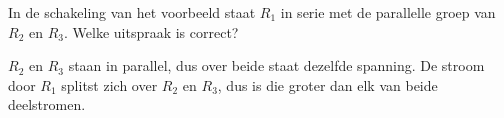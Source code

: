 \documentclass{ximera}
\begin{document}
\begin{question}
    In de schakeling van het voorbeeld staat $R_1$ in serie met de parallelle groep van $R_2$ en $R_3$. Welke uitspraak is correct?
    \begin{multipleChoice}
    \end{multipleChoice}
    \begin{solution}
        $R_2$ en $R_3$ staan in parallel, dus over beide staat dezelfde spanning. De stroom door $R_1$ splitst zich over $R_2$ en $R_3$, dus is die groter dan elk van beide deelstromen.
    \end{solution}
\end{question}
\end{document}
